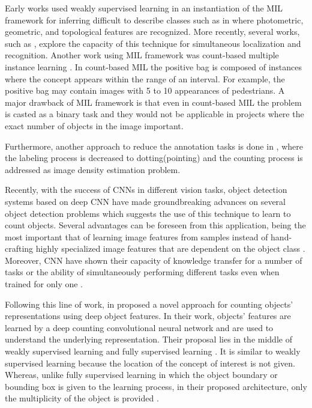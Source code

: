 \indent Early works used weakly supervised learning in an instantiation of the MIL framework for inferring difficult to describe classes such as in \cite{todorovic2006extracting} where photometric, geometric, and topological features are recognized. More recently, several works, such as \cite{nguyen2009weakly}, explore the capacity of this technique for simultaneous localization and recognition. Another work using MIL framework was count-based multiple instance learning \cite{foulds2010review}. In count-based MIL the positive bag is composed of instances where the concept appears within the range of an interval. For example, the positive bag may contain images with 5 to 10 appearances of pedestrians. A major drawback of MIL framework is that even in count-based MIL the problem is casted as a binary task and they would not be applicable in projects where the exact number of objects in the image important. 

Furthermore, another approach to reduce the annotation tasks is done in \cite{flaccavento2011learning}, where the labeling process is decreased to dotting(pointing) and the counting process is addressed as image density estimation problem.  

Recently, with the success of CNNs in different vision tasks, object detection systems based on deep CNN have made groundbreaking advances on several object detection problems \cite{erhan2014scalable, girshick2014rich} which suggests the use of this technique to learn to count objects. Several advantages can be foreseen from this application, being the most important that of learning image features from samples instead of hand-crafting highly specialized image features that are dependent on the object class \cite{segui2015learning}. Moreover, CNN have shown their capacity of knowledge transfer for a number of tasks or the ability of simultaneously performing different tasks even when trained for only one \cite{zhou2014learning}. 

Following this line of work,   in \cite{segui2015learning} proposed a novel approach for counting objects' representations using deep object features. In their work, objects' features are learned by a deep counting convolutional neural network and are used to understand the underlying representation. Their proposal lies in the middle of weakly supervised learning and fully supervised learning \cite{mohri2012foundations}. It is similar to weakly supervised learning because the location of the concept of interest is not given. Whereas, unlike fully supervised learning in which the object boundary or bounding box is given to the learning process, in their proposed architecture, only the multiplicity of the object is provided \cite{segui2015learning}.

